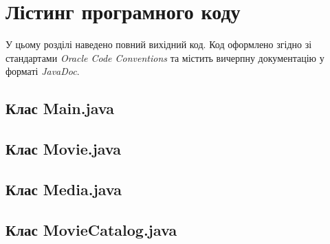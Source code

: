 \section{Лістинг програмного коду}

У цьому розділі наведено повний вихідний код. 
Код оформлено згідно зі стандартами \textit{Oracle Code Conventions} та містить 
вичерпну документацію у форматі \textit{JavaDoc}.
\subsection{Клас Main.java}

\newpage %
\subsection{Клас Movie.java}

\newpage %
\subsection{Клас Media.java}

\newpage %
\subsection{Клас MovieCatalog.java}
